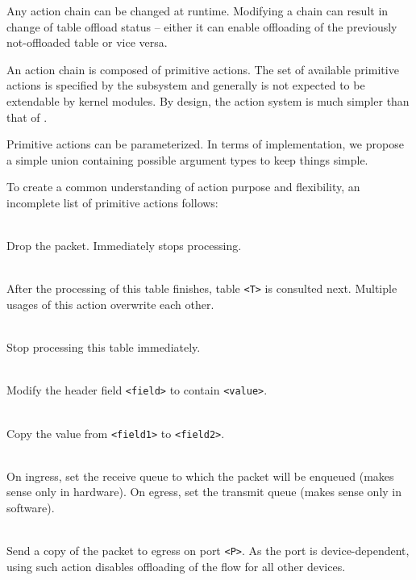 Any action chain can be changed at runtime. Modifying a chain can result in
change of table offload status -- either it can enable offloading of the previously
not-offloaded table or vice versa.

An action chain is composed of primitive actions. The set of available
primitive actions is specified by the subsystem and generally is not
expected to be extendable by kernel modules. By design, the action system is
much simpler than that of .

Primitive actions can be parameterized. In terms of implementation, we propose
a simple union containing possible argument types to keep things simple.

To create a common understanding of action purpose and flexibility, an
incomplete list of primitive actions follows:

\newcommand{\act}[1]{\texttt{#1}}
\begin{description}[noitemsep]
\item[\act{drop}] \hfill \\
	Drop the packet. Immediately stops processing.
\item[\act{set next table <T>}] \hfill \\
	After the processing of this table finishes, table \texttt{<T>} is
consulted next. Multiple usages of this action overwrite each other.
\item[\act{stop}] \hfill \\
	Stop processing this table immediately.
\item[\act{set field <field> <value>}] \hfill \\
	Modify the header field \texttt{<field>} to contain \texttt{<value>}.
\item[\act{copy value <field1> <field2>}] \hfill \\
	Copy the value from \texttt{<field1>} to \texttt{<field2>}.
\item[\act{set queue <Q>}] \hfill \\
	On ingress, set the receive queue to which the packet will be enqueued
	(makes sense only in hardware). On egress, set the transmit queue (makes
	sense only in software).
\item[\act{mirror to port <P>}] \hfill \\
	Send a copy of the packet to egress on port \texttt{<P>}. As the port is
	device-dependent, using such action disables offloading of the flow for all
	other devices.
\end{description}

